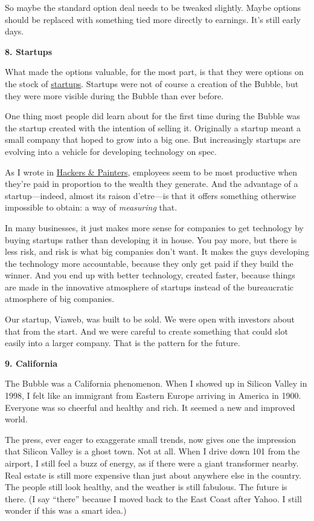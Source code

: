 So maybe the standard option deal needs to be tweaked slightly. Maybe
options should be replaced with something tied more directly to
earnings. It's still early days.

\textbf{8. Startups}

What made the options valuable, for the most part, is that they were
options on the stock of \href{start.html}{startups}. Startups were not
of course a creation of the Bubble, but they were more visible during
the Bubble than ever before.

One thing most people did learn about for the first time during the
Bubble was the startup created with the intention of selling it.
Originally a startup meant a small company that hoped to grow into a big
one. But increasingly startups are evolving into a vehicle for
developing technology on spec.

As I wrote in \href{hackpaint.html}{Hackers \& Painters}, employees seem
to be most productive when they're paid in proportion to the wealth they
generate. And the advantage of a startup---indeed, almost its raison
d'etre---is that it offers something otherwise impossible to obtain: a
way of \emph{measuring} that.

In many businesses, it just makes more sense for companies to get
technology by buying startups rather than developing it in house. You
pay more, but there is less risk, and risk is what big companies don't
want. It makes the guys developing the technology more accountable,
because they only get paid if they build the winner. And you end up with
better technology, created faster, because things are made in the
innovative atmosphere of startups instead of the bureaucratic atmosphere
of big companies.

Our startup, Viaweb, was built to be sold. We were open with investors
about that from the start. And we were careful to create something that
could slot easily into a larger company. That is the pattern for the
future.

\textbf{9. California}

The Bubble was a California phenomenon. When I showed up in Silicon
Valley in 1998, I felt like an immigrant from Eastern Europe arriving in
America in 1900. Everyone was so cheerful and healthy and rich. It
seemed a new and improved world.

The press, ever eager to exaggerate small trends, now gives one the
impression that Silicon Valley is a ghost town. Not at all. When I drive
down 101 from the airport, I still feel a buzz of energy, as if there
were a giant transformer nearby. Real estate is still more expensive
than just about anywhere else in the country. The people still look
healthy, and the weather is still fabulous. The future is there. (I say
``there'' because I moved back to the East Coast after Yahoo. I still
wonder if this was a smart idea.)

